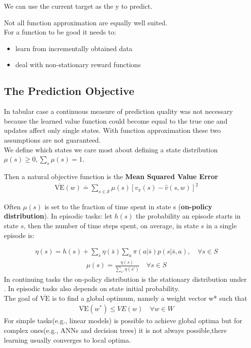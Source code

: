 We can use the current target as the y to predict.


Not all function approximation are equally well suited.\\

For a function to be good it needs to:
\begin{itemize}
    \item learn from incrementally obtained data
    \item deal with non-stationary reward functions
\end{itemize}
\subsection{The Prediction Objective}
In tabular case a continuous measure of prediction quality was not necessary because the learned value function could become equal to the true one and updates affect only single states.
With function approximation these two assumptions are not guaranteed.\\

We define which states we care most about defining a state distribution $\mu(s)\ge0,\sum_s\mu(s)=1$.

Then a natural objective function is the \textbf{Mean Squared Value Error}
\begin{align}
    \overline{\mbox{VE}}(w)\doteq\sum_{s\in\mathcal{S}}\mu(s)[v_\pi(s)-\hat{v}(s, w)]^2
\end{align}

Often $\mu(s)$ is set to the fraction of time spent in state s (\textbf{on-policy
distribution}).
In episodic tasks: let $h(s)$ the probability an episode starts in state $s$,
then the number of time steps spent, on average, in state $s$ in a
single episode is:

\begin{align}
    \eta(s)=h(s)+\sum_{\bar{s}}\eta(\bar{s})\sum_a\pi(a | \bar{s})p(s | \bar{s},a),\quad\forall s\in S
\end{align}
\begin{align}
    \mu(s)=\frac{\eta(s)}{\sum_{s'}\eta(s')}\quad\forall s\in S
\end{align}
In continuing tasks the on-policy distribution is the stationary
distribution under . In episodic tasks also depends on state initial
probability.\\


The goal of $\overline{\mbox{VE}}$ is to find a global optimum, namely a weight vector w* such that
\begin{align}
    \overline{\mbox{VE}}(w^*)\leq VE(w)\quad \forall w\in W
\end{align}
For simple tasks(e.g., linear
models) is possible to achieve global optima but for complex ones(e.g., ANNs and decision trees) it is not always possible,there learning usually converges to local optima.
